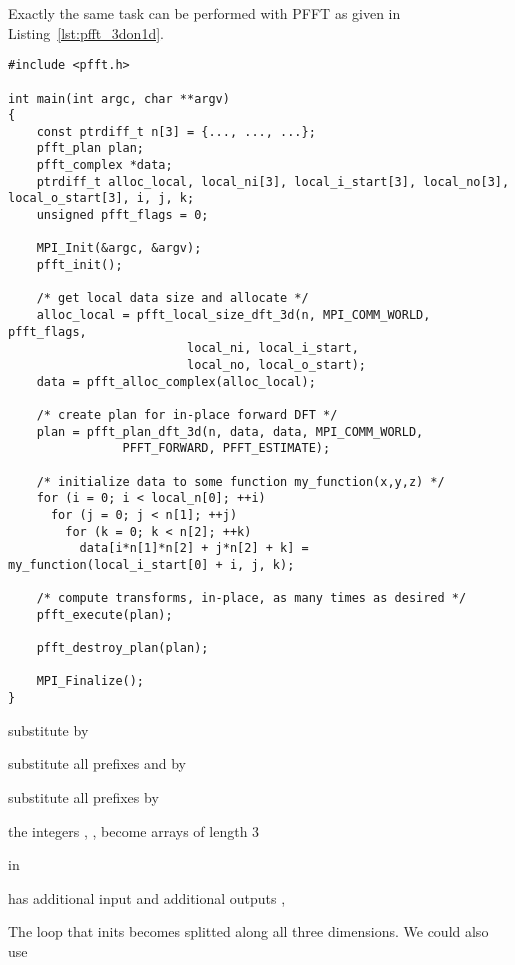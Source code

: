 Exactly the same task can be performed with PFFT as given in Listing~\ref{lst:pfft_3don1d}.
\begin{lstlisting}
#include <pfft.h>
     
int main(int argc, char **argv)
{
    const ptrdiff_t n[3] = {..., ..., ...};
    pfft_plan plan;
    pfft_complex *data;
    ptrdiff_t alloc_local, local_ni[3], local_i_start[3], local_no[3], local_o_start[3], i, j, k;
    unsigned pfft_flags = 0;

    MPI_Init(&argc, &argv);
    pfft_init();

    /* get local data size and allocate */
    alloc_local = pfft_local_size_dft_3d(n, MPI_COMM_WORLD, pfft_flags,
				         local_ni, local_i_start,
				         local_no, local_o_start);
    data = pfft_alloc_complex(alloc_local);

    /* create plan for in-place forward DFT */
    plan = pfft_plan_dft_3d(n, data, data, MPI_COMM_WORLD,
			    PFFT_FORWARD, PFFT_ESTIMATE);

    /* initialize data to some function my_function(x,y,z) */
    for (i = 0; i < local_n[0]; ++i) 
      for (j = 0; j < n[1]; ++j) 
        for (k = 0; k < n[2]; ++k)
          data[i*n[1]*n[2] + j*n[2] + k] = my_function(local_i_start[0] + i, j, k);

    /* compute transforms, in-place, as many times as desired */
    pfft_execute(plan);

    pfft_destroy_plan(plan);

    MPI_Finalize();
}
\end{lstlisting}



\begin{compactitem}
  \item substitute  by 
  \item substitute all prefixes  and  by 
  \item substitute all prefixes  by 
  \item the integers , ,  become arrays of length 3
  \item {} in 
  \item {} has additional input  and additional outputs , 
  \item The loop that inits  becomes splitted along all three dimensions. We could also use 
  
  
\end{compactitem}


